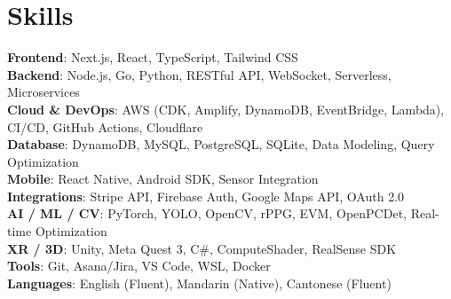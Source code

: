 \documentclass[letterpaper,11pt]{article}
\begin{document}
\section{Skills}
 \begin{itemize}[leftmargin=0.15in, label={}]
    \small{\item{
     \textbf{Frontend}{: Next.js, React, TypeScript, Tailwind CSS} \\
     \textbf{Backend}{: Node.js, Go, Python, RESTful API, WebSocket, Serverless, Microservices} \\
     \textbf{Cloud \& DevOps}{: AWS (CDK, Amplify, DynamoDB, EventBridge, Lambda), CI/CD, GitHub Actions, Cloudflare} \\
     \textbf{Database}{: DynamoDB, MySQL, PostgreSQL, SQLite, Data Modeling, Query Optimization} \\
     \textbf{Mobile}{: React Native, Android SDK, Sensor Integration} \\
     \textbf{Integrations}{: Stripe API, Firebase Auth, Google Maps API, OAuth 2.0} \\
     \textbf{AI / ML / CV}{: PyTorch, YOLO, OpenCV, rPPG, EVM, OpenPCDet, Real-time Optimization} \\
     \textbf{XR / 3D}{: Unity, Meta Quest 3, C\#, ComputeShader, RealSense SDK} \\
     \textbf{Tools}{: Git, Asana/Jira, VS Code, WSL, Docker} \\
     \textbf{Languages}{: English (Fluent), Mandarin (Native), Cantonese (Fluent)}
    }}
 \end{itemize}

\end{document}
